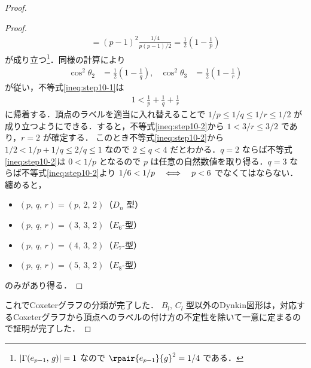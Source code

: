 \documentclass[rep_main]{subfiles}
\begin{document}
\begin{proof}
\begin{proof}
\begin{align}
			= (p-1)^2 \frac{1/4}{p(p-1)/2}
			= \frac{1}{2} \left( 1 - \frac{1}{p}\right) 
		\end{align}
		が成り立つ\footnote{$\abs{\Gamma(e_{p-1},\, g)} = 1$ なので $\rpair{e_{p-1}}{g}^2 = 1/4$ である．}．同様の計算により
		\begin{align}
			\cos^2 \theta_2 &= \frac{1}{2} \left( 1 - \frac{1}{q}\right), &\cos^2 \theta_3 &= \frac{1}{2} \left( 1 - \frac{1}{r}\right)
		\end{align}
		が従い，不等式\eqref{ineq:step10-1}は
		\begin{align}
			\label{ineq:step10-2}
			1 < \frac{1}{p} + \frac{1}{q} + \frac{1}{r}
		\end{align}
		に帰着する．頂点のラベルを適当に入れ替えることで $1/p \le 1/q \le 1/r \le 1/2$ が成り立つようにできる．すると，不等式\eqref{ineq:step10-2}から $1 < 3/r \le 3/2$ であり，$r = 2$ が確定する．
		このとき不等式\eqref{ineq:step10-2}から
		$1/2 < 1/p + 1/q \le 2/q \le 1$ 
		なので $2 \le q < 4$ だとわかる．$q = 2$ ならば不等式\eqref{ineq:step10-2}は $0 < 1/p$ となるので $p$ は任意の自然数値を取り得る．$q = 3$ ならば不等式\eqref{ineq:step10-2}より $1/6 < 1/p \quad \Longleftrightarrow \quad p < 6$ でなくてはならない．
		纏めると，
		\begin{itemize}
			\item $(p,\, q,\, r) = (p,\, 2,\, 2)$（$D_n$ 型）
			\item $(p,\, q,\, r) = (3,\, 3,\, 2)$（$E_{6}$-型）
			\item $(p,\, q,\, r) = (4,\, 3,\, 2)$（$E_{7}$-型）
			\item $(p,\, q,\, r) = (5,\, 3,\, 2)$（$E_{8}$-型）
		\end{itemize}
		のみがあり得る．
	\end{proof}
	これでCoxeterグラフの分類が完了した．
	$B_l,\, C_l$ 型以外のDynkin図形は，対応するCoxeterグラフから頂点へのラベルの付け方の不定性を除いて一意に定まるので証明が完了した．
\end{proof}
\end{document}
